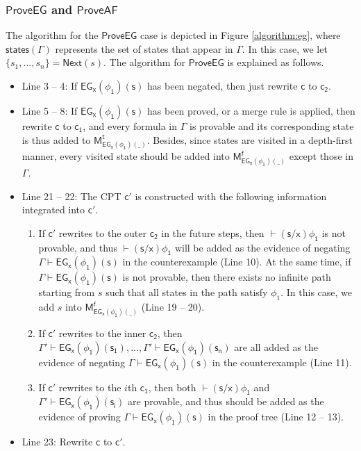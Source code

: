 \subsubsection{$\mathsf{ProveEG}$ and $\mathsf{ProveAF}$}
The algorithm for the $\mathsf{ProveEG}$ case is depicted in Figure \ref{algorithm:eg}, where $\mathsf{states(\Gamma)}$ represents the set of states that appear in $\mathsf{\Gamma}$. In this case, we let $\{s_1,...,s_n\}=\textsf{Next}(s)$.
The algorithm for $\mathsf{ProveEG}$ is explained as follows.
\begin{itemize}
	\item Line 3 -- 4: If $\mathsf{EG_x(\phi_1)(s)}$ has been negated, then just rewrite $\mathsf{c}$ to $\mathsf{c_2}$.
	\item Line 5 -- 8: If $\mathsf{EG_x(\phi_1)(s)}$ has been proved, or a merge rule is applied, then rewrite $\mathsf{c}$ to $\mathsf{c_1}$, and every formula in $\mathsf{\Gamma}$ is provable and its corresponding state is thus added to $\mathsf{M_{EG_x(\phi_1)(\_)}^t}$. Besides, since states are visited in a depth-first manner, every visited state should be added into $\mathsf{M_{EG_x(\phi_1)(\_)}^f}$ except those in $\mathsf{\Gamma}$.
	\item Line 21 -- 22: The \textsf{CPT} $\mathsf{c'}$ is constructed with the following information integrated into $\mathsf{c'}$.
	\begin{enumerate}
		\item If $\mathsf{c'}$ rewrites to the outer $\mathsf{c_2}$ in the future steps, then $\mathsf{\vdash(s/x)\phi_1}$ is not provable, and thus $\mathsf{\vdash(s/x)\phi_1}$ will be added as the evidence of negating $\mathsf{\Gamma\vdash EG_x(\phi_1)(s)}$ in the counterexample (Line 10). 
		At the same time, if $\mathsf{\Gamma\vdash EG_x(\phi_1)(s)}$ is not provable, then there exists no infinite path starting from $s$ such that all states in the path satisfy $\phi_1$. In this case, we add $s$ into $\mathsf{M_{EG_x(\phi_1)(\_)}^f}$ (Line 19 -- 20).
		
		\item If $\mathsf{c'}$ rewrites to the inner $\mathsf{c_2}$, then $\mathsf{\Gamma'\vdash EG_x(\phi_1)(s_1)}, ... , \mathsf{\Gamma'\vdash EG_x(\phi_1)(s_n)}$ are all added as the evidence of negating $\mathsf{\Gamma\vdash EG_x(\phi_1)(s)}$ in the counterexample (Line 11).
		\item If $\mathsf{c'}$ rewrites to the $i$th $\mathsf{c_1}$, then both $\mathsf{\vdash(s/x)\phi_1}$ and $\mathsf{\Gamma'\vdash EG_x(\phi_1)(s_i)}$ are provable, and thus should be added as the evidence of proving $\mathsf{\Gamma\vdash EG_x(\phi_1)(s)}$ in the proof tree (Line 12 -- 13). 
	\end{enumerate}
	\item Line 23: Rewrite $\mathsf{c}$ to $\mathsf{c'}$.
\end{itemize}



